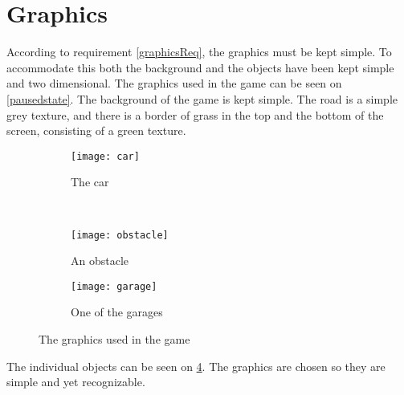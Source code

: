 \section{Graphics}
According to requirement \ref{graphicsReq}, the graphics must be kept simple.
To accommodate this both the background and the objects have been kept simple and two dimensional.
The graphics used in the game can be seen on \cref{pausedstate}.
The background of the game is kept simple.
The road is a simple grey texture, and there is a border of grass in the top and the bottom of the screen, consisting of a green texture.

\begin{figure}[h]
\begin{subfigure}{0.5\textwidth}
\centering
\texttt{[image: car]}
\caption{The car}
\label{car}
\end{subfigure}
~
\begin{subfigure}{0.5\textwidth}
\centering
\texttt{[image: obstacle]}
\caption{An obstacle}
\label{obstacle}
\end{subfigure}

\begin{subfigure}{\textwidth}
\centering
\texttt{[image: garage]}
\caption{One of the garages}
\label{garage}
\end{subfigure}
\caption{The graphics used in the game}
\label{graphicszoom}
\end{figure}

The individual objects can be seen on \cref{graphicszoom}.
The graphics are chosen so they are simple and yet recognizable.